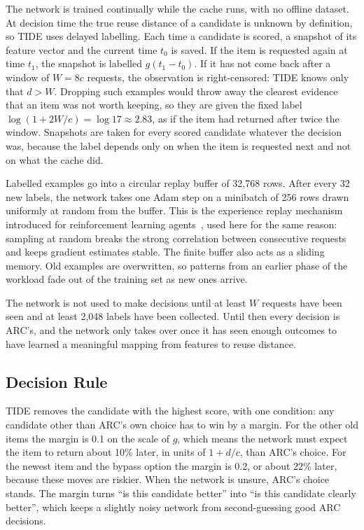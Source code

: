 \documentclass{llncs}
\begin{document}
The network is trained continually while the cache runs, with no offline dataset. At decision time the true reuse distance of a candidate is unknown by definition, so TIDE uses delayed labelling. Each time a candidate is scored, a snapshot of its feature vector and the current time $t_0$ is saved. If the item is requested again at time $t_1$, the snapshot is labelled $g(t_1 - t_0)$. If it has not come back after a window of $W = 8c$ requests, the observation is right-censored: TIDE knows only that $d > W$. Dropping such examples would throw away the clearest evidence that an item was not worth keeping, so they are given the fixed label $\log(1 + 2W/c) = \log 17 \approx 2.83$, as if the item had returned after twice the window. Snapshots are taken for every scored candidate whatever the decision was, because the label depends only on when the item is requested next and not on what the cache did.

Labelled examples go into a circular replay buffer of 32,768 rows. After every 32 new labels, the network takes one Adam step on a minibatch of 256 rows drawn uniformly at random from the buffer. This is the experience replay mechanism introduced for reinforcement learning agents~\cite{lin1992}, used here for the same reason: sampling at random breaks the strong correlation between consecutive requests and keeps gradient estimates stable. The finite buffer also acts as a sliding memory. Old examples are overwritten, so patterns from an earlier phase of the workload fade out of the training set as new ones arrive.

The network is not used to make decisions until at least $W$ requests have been seen and at least 2,048 labels have been collected. Until then every decision is ARC's, and the network only takes over once it has seen enough outcomes to have learned a meaningful mapping from features to reuse distance.

\subsection{Decision Rule}
\label{sec:decision}

TIDE removes the candidate with the highest score, with one condition: any candidate other than ARC's own choice has to win by a margin. For the other old items the margin is 0.1 on the scale of $g$, which means the network must expect the item to return about 10\% later, in units of $1 + d/c$, than ARC's choice. For the newest item and the bypass option the margin is 0.2, or about 22\% later, because these moves are riskier. When the network is unsure, ARC's choice stands. The margin turns ``is this candidate better'' into ``is this candidate clearly better'', which keeps a slightly noisy network from second-guessing good ARC decisions.
\end{document}
